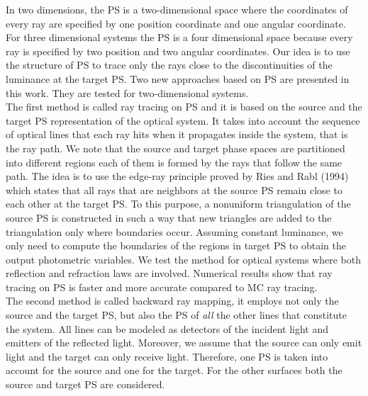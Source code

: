 In two dimensions, the PS is a two-dimensional space where the coordinates of every ray are specified by one position coordinate and one angular coordinate. 
For three dimensional systems the PS is a four dimensional space because every ray is specified by two position and two angular coordinates. Our idea is to use the structure of PS to trace only the rays close to the discontinuities of the luminance at the target PS.
Two new approaches based on PS are presented in this work. They are tested for two-dimensional systems. 
\\ \indent The first method is called ray tracing on PS and it is based on the source and the target PS representation of the optical system. It takes into account the sequence of optical lines that each ray hits when it propagates inside the system, that is the ray path. We note that the source and target phase spaces are partitioned into different regions each of them is formed by the rays that follow the same path. The idea is to use the edge-ray principle proved by Ries and Rabl (1994) which states that all rays that are neighbors at the source PS remain close to each other at the target PS. To this purpose, a nonuniform triangulation of the source PS is constructed in such a way that new triangles are added to the triangulation only where boundaries occur. 
Assuming constant luminance, we only need to compute the boundaries of the regions in target PS to obtain the output photometric variables. 
We test the method for optical systems where both reflection and refraction laws are involved.
 Numerical results show that ray tracing on PS is faster and more accurate compared to MC ray tracing.
\\ \indent The second method is called backward ray mapping, it employs not only the source and the target PS, but also the PS of \textit{all} the other lines that constitute the system.
All lines can be modeled as detectors of the incident light and emitters of the reflected light.
Moreover, we assume that the source can only emit light and the target can only receive light.
Therefore, one PS is taken into account for the source and one for the target. For the other surfaces both the source and target PS are considered.
